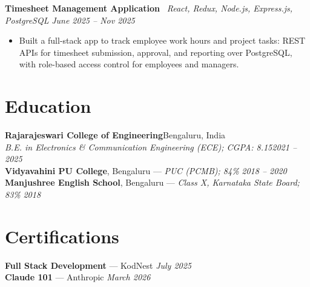 \documentclass[a4paper,10pt]{article}
\newcommand{\heading}[2]{\textbf{#1}\hfill #2\\[1pt]}
\newcommand{\subheading}[2]{\textit{#1}\hfill \textit{#2}\\[1pt]}
\begin{document}
\vspace{4pt}
\textbf{Timesheet Management Application} \ {\small\textit{React, Redux, Node.js, Express.js, PostgreSQL}}
\hfill \textit{June 2025 -- Nov 2025}
\begin{itemize}
  \item Built a full-stack app to track employee work hours and project tasks: REST APIs for timesheet
        submission, approval, and reporting over PostgreSQL, with role-based access control for
        employees and managers.
\end{itemize}

\section{Education}
\heading{Rajarajeswari College of Engineering}{Bengaluru, India}
\subheading{B.E. in Electronics \& Communication Engineering (ECE); CGPA: 8.15}{2021 -- 2025}
\textbf{Vidyavahini PU College}, Bengaluru --- \textit{PUC (PCMB); 84\%} \hfill \textit{2018 -- 2020}\\[1pt]
\textbf{Manjushree English School}, Bengaluru --- \textit{Class X, Karnataka State Board; 83\%}
\hfill \textit{2018}

\section{Certifications}
\textbf{Full Stack Development} --- KodNest \hfill \textit{July 2025}\\[2pt]
\textbf{Claude 101} --- Anthropic \hfill \textit{March 2026}
\end{document}
